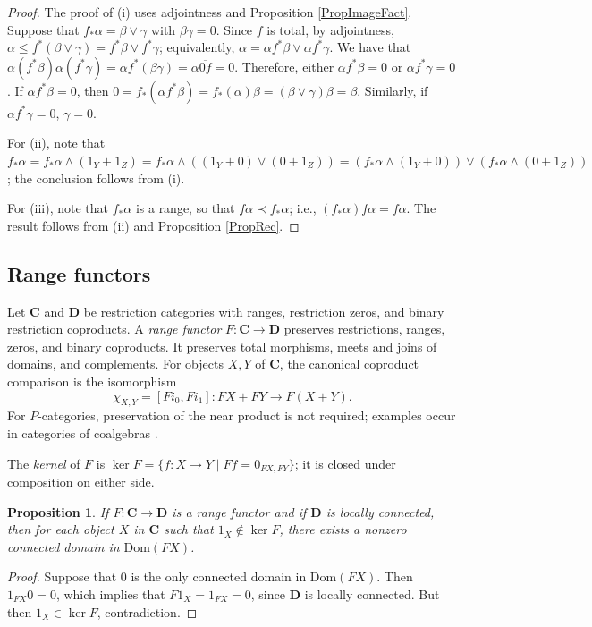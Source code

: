\documentclass[letterpaper,10pt]{amsart}
\theoremstyle{plain}
\newtheorem{prop}[thm]{Proposition}
\theoremstyle{definition}
\newcommand{\rst}[1]{\overline{#1}}
\begin{document}
\begin{proof}
The proof of (i) uses adjointness and Proposition \ref{PropImageFact}.
Suppose that $f_*\alpha=\beta\vee\gamma$ with $\beta\gamma=0$. Since $f$ is total, by
adjointness, $\alpha\le
f^*(\beta\vee\gamma)=f^*\beta\vee f^*\gamma$;
equivalently, $\alpha=\alpha f^*\beta\vee\alpha f^*\gamma$. We
have that
$\alpha(f^*\beta)\alpha(f^*\gamma)=\alpha f^*(\beta\gamma)=\alpha\rst{0f}=0$.
Therefore, either $\alpha f^*\beta=0$ or $\alpha f^*\gamma=0$.
If $\alpha f^*\beta=0$, then
$0=f_*(\alpha f^*\beta)=f_*(\alpha)\beta=(\beta\vee\gamma)\beta=\beta$.
Similarly, if $\alpha f^*\gamma=0$, $\gamma=0$.

For (ii), note that $f_*\alpha=f_*\alpha\wedge(1_Y+
1_Z)=f_*\alpha\wedge((1_Y+ 0)\vee(0+ 1_Z))
=(f_*\alpha\wedge(1_Y+ 0))\vee (f_*\alpha\wedge(0+ 1_Z))$;
the conclusion follows from (i).

For (iii), note that $f_*\alpha$ is a range, so that $f\alpha\prec
f_*\alpha$; i.e., $(f_*\alpha)f\alpha =f\alpha$. The result
follows from (ii) and Proposition \ref{PropRec}.
\end{proof}

\subsection{Range functors}
Let $\mathbf C$ and $\mathbf D$ be restriction categories with ranges,
restriction zeros, and binary restriction coproducts. A \textit{range
functor} $F:\mathbf C\to\mathbf D$ preserves restrictions, ranges,
zeros, and binary coproducts. It preserves total morphisms, meets and
joins of domains, and complements. For objects $X,Y$ of $\mathbf C$,
the canonical coproduct comparison is the isomorphism
\[
 \chi_{X,Y}=[Fi_0,Fi_1]:FX+FY\longrightarrow F(X+Y).
\]
For $P$-categories,
preservation of the near product is not required; examples occur in
categories of coalgebras \cite{leng}.

The \textit{kernel} of $F$ is
$\ker F=\{f:X\to Y\mid Ff=0_{FX,FY}\}$; it is closed under
composition on either side.

\begin{prop}\label{PropKernel}
If $F:\mathbf{C}\rightarrow\mathbf{D}$ is a range functor and if $\mathbf{D}$
is locally connected, then for each object $X$ in $\mathbf{C}$ such that $1_X\notin\ker F$, there exists a nonzero connected domain in $\mathrm{Dom}(FX)$.
\end{prop}

\begin{proof}
Suppose that $0$ is the only connected domain in $\mathrm{Dom}(FX)$. Then $1_{F X}0 = 0$, which implies that $F1_X = 1_{F X} = 0$, since $\mathbf{D}$ is locally connected. But then
$1_X\in\ker F$, contradiction.  
\end{proof}
\end{document}
